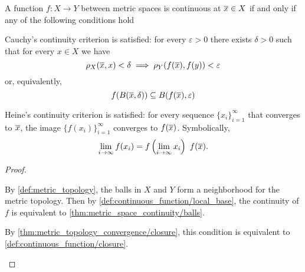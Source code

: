 \begin{theorem}\label{thm:metric_space_continuity}
  A function \( f: X \to Y \) between metric spaces is continuous at \( \overline{x} \in X \) if and only if any of the following conditions hold
  \begin{thmenum}
     Cauchy's continuity criterion is satisfied: for every \( \varepsilon > 0 \) there exists \( \delta > 0 \) such that for every \( x \in X \) we have
    \begin{equation}\label{thm:metric_space_continuity/inequality}
      \rho_X(\overline{x}, x) < \delta \implies \rho_Y(f(\overline{x}), f(y)) < \varepsilon
    \end{equation}
    or, equivalently,
    \begin{equation}\label{thm:metric_space_continuity/inclusion}
      f(B(\overline{x}, \delta)) \subseteq B(f(\overline{x}), \varepsilon)
    \end{equation}

     Heine's continuity criterion is satisfied: for every sequence \( \{ x_i \}_{i=1}^\infty \) that converges to \( \overline{x} \), the image \( \{ f(x_i) \}_{i=1}^\infty \) converges to \( f(\overline{x}) \). Symbolically,
    \begin{equation}\label{thm:metric_space_continuity/sequences/limit}
      \lim_{i \to \infty} f(x_i) = f\left(\lim_{i \to \infty} x_i \right) \ f(\overline{x}).
    \end{equation}
  \end{thmenum}
\end{theorem}
\begin{proof}
  \begin{description}
     By \cref{def:metric_topology}, the balls in \( X \) and \( Y \) form a neighborhood  for the metric topology. Then by \cref{def:continuous_function/local_base}, the continuity of \( f \) is equivalent to \cref{thm:metric_space_continuity/balls}.

     By \cref{thm:metric_topology_convergence/closure}, this condition is equivalent to \cref{def:continuous_function/closure}.
  \end{description}
\end{proof}

